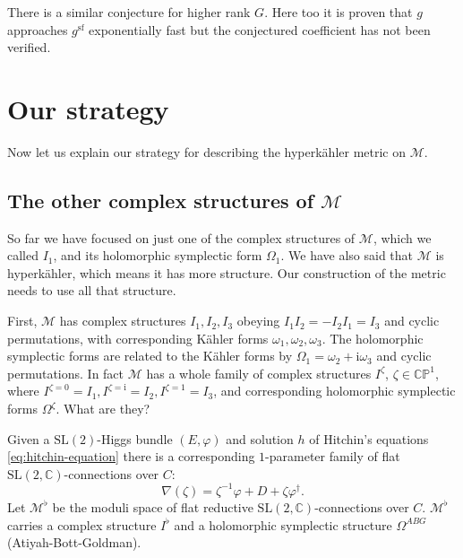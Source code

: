 \documentclass[12pt,letterpaper,reqno]{article}
\numberwithin{equation}{section}
\newcommand{\cM}{\ensuremath{\mathcal M}}
\newcommand{\bbC}{\ensuremath{\mathbb C}}
\newcommand{\bbP}{\ensuremath{\mathbb P}}
\newcommand{\kahler}{K\"ahler\xspace}
\newcommand{\hk}{hyperk\"ahler\xspace}
\newcommand{\I}{{\mathrm i}}
\renewcommand{\sf}{\mathrm{sf}}
\newcommand{\SL}{\mathrm{SL}}
\begin{document}
There is a similar conjecture for higher rank
$G$. Here too it is proven that $g$ approaches
$g^\sf$ exponentially fast
\cite{F} but the conjectured coefficient has not been verified.


\section{Our strategy}

Now let us explain our strategy for describing the \hk metric on $\cM$.

\subsection{The other complex structures of \texorpdfstring{$\cM$}{M}}

So far we have focused on just one of the complex
structures of $\cM$, which we called $I_1$,
and its holomorphic symplectic form $\Omega_1$.
We have also said that $\cM$ is \hk, which means it has more structure.
Our construction of the metric needs to use all that structure.

First, $\cM$ has complex structures $I_1, I_2, I_3$ obeying
$I_1 I_2 = -I_2 I_1 = I_3$ and cyclic permutations,
with corresponding \kahler forms $\omega_1, \omega_2, \omega_3$.
The holomorphic symplectic forms are related to the
\kahler forms by $\Omega_1 = \omega_2 + \I \omega_3$ 
and cyclic permutations.
In fact $\cM$ has a whole family of complex structures 
$I^\zeta$, $\zeta \in \bbC\bbP^1$, where
$I^{\zeta=0} = I_1, I^{\zeta = \I} = I_2, I^{\zeta = 1} = I_3$,
and corresponding holomorphic symplectic forms $\Omega^\zeta$.
What are they?

Given a $\SL(2)$-Higgs bundle $(E,\varphi)$ and 
solution $h$ of Hitchin's equations \eqref{eq:hitchin-equation}
there is a corresponding $1$-parameter family of flat
$\SL(2,\bbC)$-connections over $C$:
\begin{equation}
  \nabla(\zeta) = \zeta^{-1} \varphi + D + \zeta \varphi^\dagger.
\end{equation}
Let $\cM^\flat$
be the moduli space of flat reductive 
$\SL(2,\bbC)$-connections over $C$. 
$\cM^\flat$ carries a complex structure $I^\flat$
and a holomorphic symplectic
structure $\Omega^{ABG}$ (Atiyah-Bott-Goldman).
\end{document}
